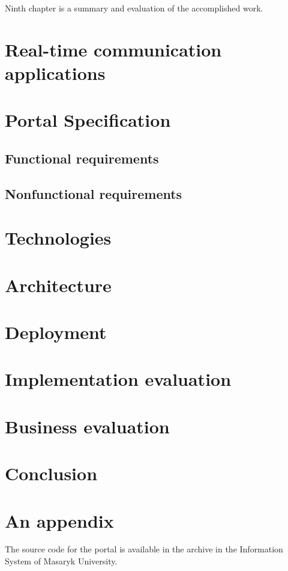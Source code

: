 \documentclass[
  digital, %
  table,   %
  lof,     %
  nolot,     %
]{fithesis3}
\begin{document}
Ninth chapter is a summary and evaluation of the accomplished work.

\chapter{Real-time communication applications}

\chapter{Portal Specification}
\section{Functional requirements}

\section{Nonfunctional requirements}

\chapter{Technologies}

\chapter{Architecture}

\chapter{Deployment}

\chapter{Implementation evaluation}

\chapter{Business evaluation}

\chapter{Conclusion}

\printbibliography[heading=bibintoc] %

\appendix %
\chapter{An appendix}
The source code for the portal is available in the archive in the Information System of Masaryk University.
\end{document}
